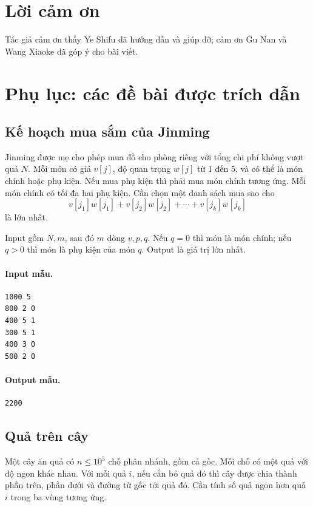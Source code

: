 \documentclass[11pt]{article}
\begin{document}
\section*{Lời cảm ơn}

Tác giả cảm ơn thầy Ye Shifu đã hướng dẫn và giúp đỡ; cảm ơn Gu Nan và Wang
Xiaoke đã góp ý cho bài viết.

\section{Phụ lục: các đề bài được trích dẫn}

\subsection*{Kế hoạch mua sắm của Jinming}

Jinming được mẹ cho phép mua đồ cho phòng riêng với tổng chi phí không vượt
quá \(N\). Mỗi món có giá \(v[j]\), độ quan trọng \(w[j]\) từ \(1\) đến \(5\),
và có thể là món chính hoặc phụ kiện. Nếu mua phụ kiện thì phải mua món chính
tương ứng. Mỗi món chính có tối đa hai phụ kiện. Cần chọn một danh sách mua
sao cho
\[
  v[j_1]w[j_1]+v[j_2]w[j_2]+\cdots+v[j_k]w[j_k]
\]
là lớn nhất.

Input gồm \(N,m\), sau đó \(m\) dòng \(v,p,q\). Nếu \(q=0\) thì món là món
chính; nếu \(q>0\) thì món là phụ kiện của món \(q\). Output là giá trị lớn
nhất.

\paragraph{Input mẫu.}
\begin{verbatim}
1000 5
800 2 0
400 5 1
300 5 1
400 3 0
500 2 0
\end{verbatim}

\paragraph{Output mẫu.}
\begin{verbatim}
2200
\end{verbatim}

\subsection*{Quả trên cây}

Một cây ăn quả có \(n\le 10^5\) chỗ phân nhánh, gồm cả gốc. Mỗi chỗ có một quả
với độ ngon khác nhau. Với mỗi quả \(i\), nếu cắn bỏ quả đó thì cây được chia
thành phần trên, phần dưới và đường từ gốc tới quả đó. Cần tính số quả ngon
hơn quả \(i\) trong ba vùng tương ứng.
\end{document}
